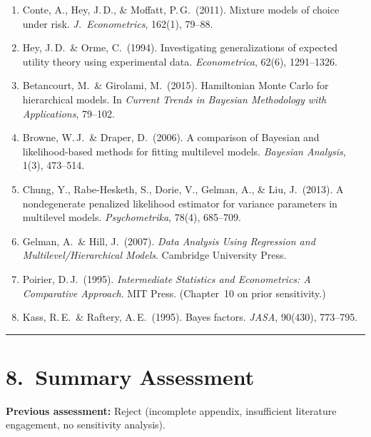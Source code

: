 \documentclass[12pt,a4paper]{article}
\begin{document}
\begin{enumerate}[leftmargin=1.5em]
\item[13.] Conte, A., Hey, J.\,D., \& Moffatt, P.\,G.\ (2011).  Mixture models
of choice under risk.  \textit{J.\ Econometrics}, 162(1), 79--88.

\item[14.] Hey, J.\,D.\ \& Orme, C.\ (1994).  Investigating generalizations of
expected utility theory using experimental data.  \textit{Econometrica}, 62(6),
1291--1326.

\item[15.] Betancourt, M.\ \& Girolami, M.\ (2015).  Hamiltonian Monte Carlo for
hierarchical models.  In \textit{Current Trends in Bayesian Methodology with
Applications}, 79--102.

\item[16.] Browne, W.\,J.\ \& Draper, D.\ (2006).  A comparison of Bayesian and
likelihood-based methods for fitting multilevel models.  \textit{Bayesian
Analysis}, 1(3), 473--514.

\item[17.] Chung, Y., Rabe-Hesketh, S., Dorie, V., Gelman, A., \& Liu, J.\
(2013).  A nondegenerate penalized likelihood estimator for variance parameters
in multilevel models.  \textit{Psychometrika}, 78(4), 685--709.

\item[18.] Gelman, A.\ \& Hill, J.\ (2007).  \textit{Data Analysis Using
Regression and Multilevel/Hierarchical Models}.  Cambridge University Press.

\item[19.] Poirier, D.\,J.\ (1995).  \textit{Intermediate Statistics and
Econometrics: A Comparative Approach}.  MIT Press.  (Chapter~10 on prior
sensitivity.)

\item[20.] Kass, R.\,E.\ \& Raftery, A.\,E.\ (1995).  Bayes factors.
\textit{JASA}, 90(430), 773--795.
\end{enumerate}

\vspace{0.5em}
\hrule
\vspace{0.5em}

\section{8.\ Summary Assessment}

\textbf{Previous assessment:} Reject (incomplete appendix, insufficient
literature engagement, no sensitivity analysis).
\end{document}
